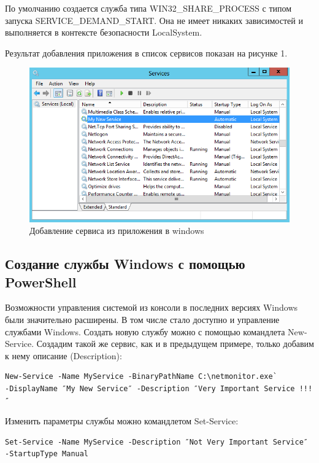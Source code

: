 По умолчанию создается служба типа WIN32\_SHARE\_PROCESS с типом запуска SERVICE\_DEMAND\_START. Она не имеет никаких зависимостей и выполняется в контексте безопасности LocalSystem.

Результат добавления приложения в список сервисов показан на рисунке 1.

\begin{figure}[H]
 \centering
 \includegraphics[scale=1]{res/pic001}
 \caption{Добавление сервиса из приложения в windows}
\end{figure}

\subsection{Создание службы Windows с помощью PowerShell}

Возможности управления системой из консоли в последних версиях Windows были значительно расширены. В том числе стало доступно и управление службами Windows. Создать новую службу можно с помощью командлета New-Service. Создадим такой же сервис, как и в предыдущем примере, только добавим к нему описание (Description):

\begin{Verbatim}[frame=single]
New-Service -Name MyService -BinaryPathName C:\netmonitor.exe`
-DisplayName ″My New Service″ -Description ″Very Important Service !!!″
\end{Verbatim}

Изменить параметры службы можно командлетом Set-Service:

\begin{Verbatim}[frame=single]
Set-Service -Name MyService -Description ″Not Very Important Service″ -StartupType Manual
\end{Verbatim}

